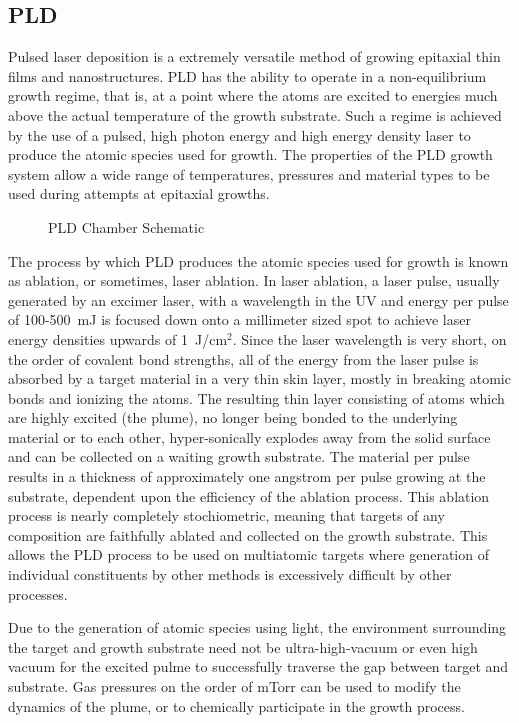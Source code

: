 \subsection{PLD}
Pulsed laser deposition is a extremely versatile method of growing epitaxial thin films and nanostructures. PLD has the ability to operate in a non-equilibrium growth regime, that is, at a point where the atoms are excited to energies much above the actual temperature of the growth substrate. Such a regime is achieved by the use of a pulsed, high photon energy and high energy density laser to produce the atomic species used for growth. The properties of the PLD growth system allow a wide range of temperatures, pressures and material types to be used during attempts at epitaxial growths.
\begin{figure}
    \caption{\label{fig:exp_pld_chamber}PLD Chamber Schematic}
\end{figure}
The process by which PLD produces the atomic species used for growth is known as ablation, or sometimes, laser ablation. In laser ablation, a laser pulse, usually generated by an excimer laser, with a wavelength in the UV and energy per pulse of 100-500~mJ is focused down onto a millimeter sized spot to achieve laser energy densities upwards of 1~J/cm$^2$. Since the laser wavelength is very short, on the order of covalent bond strengths, all of the energy from the laser pulse is absorbed by a target material in a very thin skin layer, mostly in breaking atomic bonds and ionizing the atoms. The resulting thin layer consisting of atoms which are highly excited (the plume), no longer being bonded to the underlying material or to each other, hyper-sonically explodes away from the solid surface and can be collected on a waiting growth substrate. The material per pulse results in a thickness of approximately one angstrom per pulse growing at the substrate, dependent upon the efficiency of the ablation process. This ablation process is nearly completely stochiometric, meaning that targets of any composition are faithfully ablated and collected on the growth substrate. This allows the PLD process to be used on multiatomic targets where generation of individual constituents by other methods is excessively difficult by other processes.

Due to the generation of atomic species using light, the environment surrounding the target and growth substrate need not be ultra-high-vacuum or even high vacuum for the excited pulme to successfully traverse the gap between target and substrate. Gas pressures on the order of mTorr can be used to modify the dynamics of the plume, or to chemically participate in the growth process.

